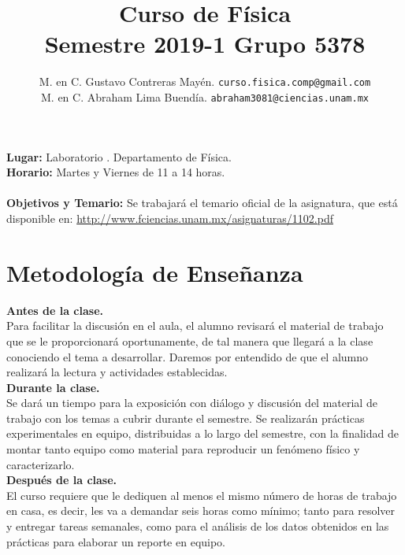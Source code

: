 \documentclass[12pt]{article}
\author{M. en C. Gustavo Contreras Mayén. \texttt{curso.fisica.comp@gmail.com}\\
M. en C. Abraham Lima Buendía. \texttt{abraham3081@ciencias.unam.mx}}
\title{Curso de Física\\{\large Semestre 2019-1 Grupo 5378}}
\date{ }
\begin{document}
\renewcommand\labelenumii{\theenumi.{\arabic{enumii}}}
\maketitle
\fontsize{12}{12}\selectfont
\textbf{Lugar: }Laboratorio . Departamento de Física.
\\
\textbf{Horario: } Martes y Viernes de 11 a 14 horas.
\\
\\
\textbf{Objetivos y Temario:} Se trabajará el temario oficial de la asignatura, que está disponible en: \href{http://www.fciencias.unam.mx/asignaturas/1102.pdf}{http://www.fciencias.unam.mx/asignaturas/1102.pdf}
\section{Metodología de Enseñanza}
\textbf{Antes de la clase.}
\\
Para facilitar la discusión en el aula, el alumno revisará el material de trabajo que se le proporcionará oportunamente, de tal manera que llegará a la clase conociendo el tema a desarrollar. Daremos por entendido de que el alumno realizará la lectura y actividades establecidas.
\\
\textbf{Durante la clase.}
\\
Se dará un tiempo para la exposición con diálogo y discusión del material de trabajo con los temas a cubrir durante el semestre. Se realizarán prácticas experimentales en equipo, distribuidas a lo largo del semestre, con la finalidad de montar tanto equipo como material para reproducir un fenómeno físico y caracterizarlo.
\\
\textbf{Después de la clase.}
\\
El curso requiere que le dediquen al menos el mismo número de horas de trabajo en casa, es decir, les va a demandar seis horas como mínimo; tanto para resolver y entregar tareas semanales, como para el análisis de los datos obtenidos en las prácticas para elaborar un reporte en equipo.
\end{document}
